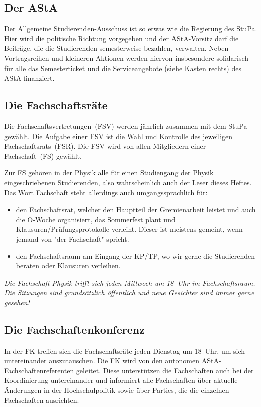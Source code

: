 \begin{multicols*}{2}
\subsection{Der AStA}
Der Allgemeine Studierenden-Ausschuss ist so etwas wie die Regierung des StuPa.
Hier wird die politische Richtung vorgegeben und der AStA-Vorsitz darf die Beiträge, die die Studierenden semesterweise bezahlen, verwalten.
Neben Vortragsreihen und kleineren Aktionen werden hiervon insbesondere solidarisch für alle das Semesterticket und die Serviceangebote (siehe Kasten rechts) des AStA finanziert.

\subsection{Die Fachschaftsräte}
Die Fachschaftsvertretungen~(FSV) werden jährlich zusammen mit dem StuPa gewählt.
Die Aufgabe einer FSV ist die Wahl und Kontrolle des jeweiligen Fachschaftsrats~(FSR).
Die FSV wird von allen Mitgliedern einer Fachschaft~(FS) gewählt.

Zur FS gehören in der Physik alle für einen Studiengang der Physik eingeschriebenen Studierenden, also wahrscheinlich auch der Leser dieses Heftes.
Das Wort Fachschaft steht allerdings auch umgangssprachlich für:
\begin{itemize}
	\item den Fachschaftsrat, welcher den Hauptteil der Gremienarbeit leistet und auch die O-Woche organisiert, das Sommerfest plant und Klausuren/Prüfungsprotokolle verleiht.
Dieser ist meistens gemeint, wenn jemand von "der Fachschaft" spricht.
	\item den Fachschaftsraum am Eingang der KP/TP, wo wir gerne die Studierenden beraten oder Klausuren verleihen.
\end{itemize}
\emph{Die Fachschaft Physik trifft sich jeden Mittwoch um 18~Uhr im Fachschaftsraum.
Die Sitzungen sind grundsätzlich öffentlich und neue Gesichter sind immer gerne gesehen!}

\subsection{Die Fachschaftenkonferenz}
In der FK treffen sich die Fachschaftsräte jeden Dienstag um 18~Uhr, um sich untereinander auszutauschen.
Die FK wird von den autonomen AStA-Fachschaftenreferenten geleitet.
Diese unterstützen die Fachschaften auch bei der Koordinierung untereinander und informiert alle Fachschaften über aktuelle Änderungen in der Hochschulpolitik sowie über Parties, die die einzelnen Fachschaften ausrichten.

\end{multicols*}


